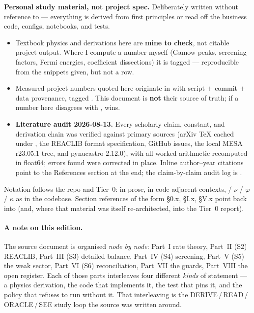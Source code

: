\begin{warn}
\textbf{Personal study material, not project spec.} Deliberately written
without reference to  --- everything is derived from first
principles or read off the business code, configs, notebooks, and tests.
\end{warn}

\begin{itemize}
\item Textbook physics and derivations here are \textbf{mine to check}, not
      citable project output. Where I compute a number myself (Gamow peaks,
      screening factors, Fermi energies, coefficient dissections) it is tagged
      \derivedhere{} --- reproducible from the snippets given, but not a
       row.

\item Measured project numbers quoted here originate in  with
      script $+$ commit $+$ data provenance, tagged . This
      document is \textbf{not} their source of truth; if a number here
      disagrees with ,  wins.

\item \textbf{Literature audit 2026-08-13.} Every scholarly claim, constant,
      and derivation chain was verified against primary sources (arXiv \TeX{}
      cached under , the REACLIB format specification,
      GitHub issues, the local MESA r23.05.1 tree, and pynucastro 2.12.0), with
      all worked arithmetic recomputed in float64; errors found were corrected
      in place. Inline author--year citations point to the References section
      at the end; the claim-by-claim audit log is .
\end{itemize}

Notation follows the repo and Tier~0:  in prose,  in
code-adjacent contexts, \Ye{} / $\nu$ / $\varphi$ / $\kappa$ as in the codebase.
Section references of the form \S0.x, \S I.x, \S V.x point back into
 (and, where that material was itself re-architected, into
the Tier~0 report).

\paragraph{A note on this edition.} The source document is organised
\emph{node by node}: Part~I rate theory, Part~II (S2) REACLIB, Part~III (S3)
detailed balance, Part~IV (S4) screening, Part~V (S5) the weak sector, Part~VI
(S6) reconciliation, Part~VII the guards, Part~VIII the open register. Each of
those parts interleaves four different \emph{kinds} of statement --- a physics
derivation, the code that implements it, the test that pins it, and the policy
that refuses to run without it. That interleaving is the DERIVE\,/\,READ\,/\,%
ORACLE\,/\,SEE study loop the source was written around.

